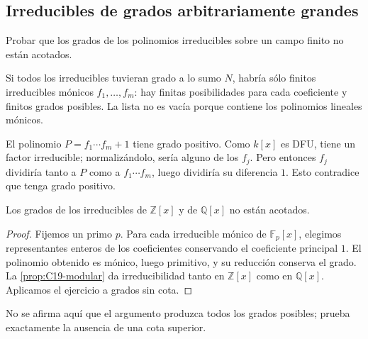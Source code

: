 \begin{samepage}
\subsection{Irreducibles de grados arbitrariamente grandes}
\begin{ejer}\label{ejer:C19-grados-finitos}
Probar que los grados de los polinomios irreducibles sobre un campo finito no están acotados.
\end{ejer}
\end{samepage}
\begin{sol}
Si todos los irreducibles tuvieran grado a lo sumo $N$, habría sólo finitos irreducibles mónicos $f_1,\ldots,f_m$: hay finitas posibilidades para cada coeficiente y finitos grados posibles. La lista no es vacía porque contiene los polinomios lineales mónicos.

El polinomio $P=f_1\cdots f_m+1$ tiene grado positivo. Como $k[x]$ es DFU, tiene un factor irreducible; normalizándolo, sería alguno de los $f_j$. Pero entonces $f_j$ dividiría tanto a $P$ como a $f_1\cdots f_m$, luego dividiría su diferencia $1$. Esto contradice que tenga grado positivo.
\end{sol}
\begin{coro}
Los grados de los irreducibles de $\mathbb Z[x]$ y de $\mathbb Q[x]$ no están acotados.
\end{coro}
\begin{proof}
Fijemos un primo $p$. Para cada irreducible mónico de $\mathbb F_p[x]$, elegimos representantes enteros de los coeficientes conservando el coeficiente principal $1$. El polinomio obtenido es mónico, luego primitivo, y su reducción conserva el grado. La \cref{prop:C19-modular} da irreducibilidad tanto en $\mathbb Z[x]$ como en $\mathbb Q[x]$. Aplicamos el ejercicio a grados sin cota.
\end{proof}
No se afirma aquí que el argumento produzca todos los grados posibles; prueba exactamente la ausencia de una cota superior.

